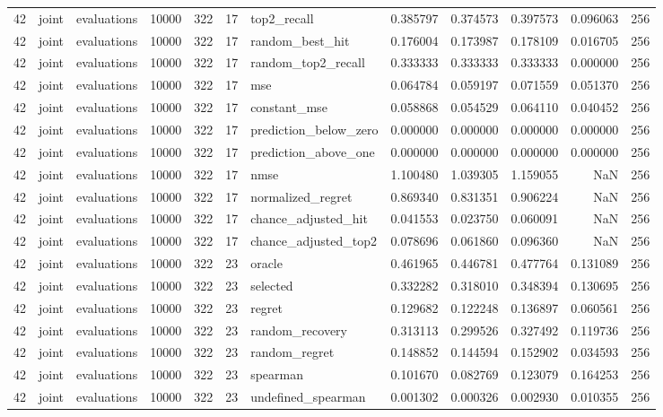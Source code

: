 \begin{tabular}{rllrrrlrrrrr}
42 & joint & evaluations & 10000 & 322 & 17 & top2_recall & 0.385797 & 0.374573 & 0.397573 & 0.096063 & 256 \\
42 & joint & evaluations & 10000 & 322 & 17 & random_best_hit & 0.176004 & 0.173987 & 0.178109 & 0.016705 & 256 \\
42 & joint & evaluations & 10000 & 322 & 17 & random_top2_recall & 0.333333 & 0.333333 & 0.333333 & 0.000000 & 256 \\
42 & joint & evaluations & 10000 & 322 & 17 & mse & 0.064784 & 0.059197 & 0.071559 & 0.051370 & 256 \\
42 & joint & evaluations & 10000 & 322 & 17 & constant_mse & 0.058868 & 0.054529 & 0.064110 & 0.040452 & 256 \\
42 & joint & evaluations & 10000 & 322 & 17 & prediction_below_zero & 0.000000 & 0.000000 & 0.000000 & 0.000000 & 256 \\
42 & joint & evaluations & 10000 & 322 & 17 & prediction_above_one & 0.000000 & 0.000000 & 0.000000 & 0.000000 & 256 \\
42 & joint & evaluations & 10000 & 322 & 17 & nmse & 1.100480 & 1.039305 & 1.159055 & NaN & 256 \\
42 & joint & evaluations & 10000 & 322 & 17 & normalized_regret & 0.869340 & 0.831351 & 0.906224 & NaN & 256 \\
42 & joint & evaluations & 10000 & 322 & 17 & chance_adjusted_hit & 0.041553 & 0.023750 & 0.060091 & NaN & 256 \\
42 & joint & evaluations & 10000 & 322 & 17 & chance_adjusted_top2 & 0.078696 & 0.061860 & 0.096360 & NaN & 256 \\
42 & joint & evaluations & 10000 & 322 & 23 & oracle & 0.461965 & 0.446781 & 0.477764 & 0.131089 & 256 \\
42 & joint & evaluations & 10000 & 322 & 23 & selected & 0.332282 & 0.318010 & 0.348394 & 0.130695 & 256 \\
42 & joint & evaluations & 10000 & 322 & 23 & regret & 0.129682 & 0.122248 & 0.136897 & 0.060561 & 256 \\
42 & joint & evaluations & 10000 & 322 & 23 & random_recovery & 0.313113 & 0.299526 & 0.327492 & 0.119736 & 256 \\
42 & joint & evaluations & 10000 & 322 & 23 & random_regret & 0.148852 & 0.144594 & 0.152902 & 0.034593 & 256 \\
42 & joint & evaluations & 10000 & 322 & 23 & spearman & 0.101670 & 0.082769 & 0.123079 & 0.164253 & 256 \\
42 & joint & evaluations & 10000 & 322 & 23 & undefined_spearman & 0.001302 & 0.000326 & 0.002930 & 0.010355 & 256 \\

\end{tabular}
